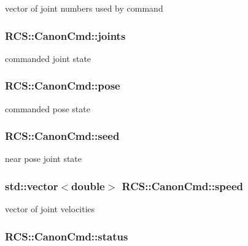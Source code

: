 vector of joint numbers used by command \hypertarget{structRCS_1_1CanonCmd_aca799c5c818f28f0d9f4797b325b03de}{
\subsubsection[{joints}]{ R\-C\-S\-::\-Canon\-Cmd\-::joints}}\label{structRCS_1_1CanonCmd_aca799c5c818f28f0d9f4797b325b03de}
commanded joint state \hypertarget{structRCS_1_1CanonCmd_adc27ad3ae01d7aab1c9c92f08df82fc1}{
\subsubsection[{pose}]{ R\-C\-S\-::\-Canon\-Cmd\-::pose}}\label{structRCS_1_1CanonCmd_adc27ad3ae01d7aab1c9c92f08df82fc1}
commanded pose state \hypertarget{structRCS_1_1CanonCmd_a577caa222abd73e6490108c7aecbc61c}{
\subsubsection[{seed}]{ R\-C\-S\-::\-Canon\-Cmd\-::seed}}\label{structRCS_1_1CanonCmd_a577caa222abd73e6490108c7aecbc61c}
near pose joint state \hypertarget{structRCS_1_1CanonCmd_aa31954bd04399469490123786ee17496}{
\subsubsection[{speed}]{\setlength{\rightskip}{0pt plus 5cm}std\-::vector$<$double$>$ R\-C\-S\-::\-Canon\-Cmd\-::speed}}\label{structRCS_1_1CanonCmd_aa31954bd04399469490123786ee17496}
vector of joint velocities \hypertarget{structRCS_1_1CanonCmd_a8ad6bd631d2cf99c00ec267791680236}{
\subsubsection[{status}]{ R\-C\-S\-::\-Canon\-Cmd\-::status}}\label{structRCS_1_1CanonCmd_a8ad6bd631d2cf99c00ec267791680236}
